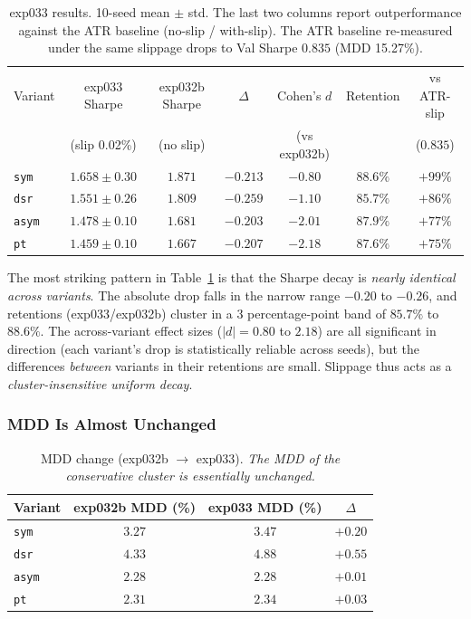 \documentclass[11pt, a4paper]{article}
\begin{document}
\begin{table}[!htbp]
\centering
\small
\caption{exp033 results. 10-seed mean $\pm$ std. The last two columns report
outperformance against the ATR baseline (no-slip / with-slip). The ATR
baseline re-measured under the same slippage drops to Val Sharpe $0.835$
(MDD 15.27\%).}
\begin{tabular}{lcccccc}
\toprule
Variant & exp033 Sharpe & exp032b Sharpe & $\Delta$ & Cohen's $d$ & Retention & vs ATR-slip \\
 & (slip 0.02\%) & (no slip) & & (vs exp032b) & & ($0.835$) \\
\midrule
\texttt{sym}  & $1.658 \pm 0.30$ & $1.871$ & $-0.213$ & $-0.80$ & $88.6\%$ & $+99\%$ \\
\texttt{dsr}  & $1.551 \pm 0.26$ & $1.809$ & $-0.259$ & $-1.10$ & $85.7\%$ & $+86\%$ \\
\texttt{asym} & $1.478 \pm 0.10$ & $1.681$ & $-0.203$ & $-2.01$ & $87.9\%$ & $+77\%$ \\
\texttt{pt}   & $1.459 \pm 0.10$ & $1.667$ & $-0.207$ & $-2.18$ & $87.6\%$ & $+75\%$ \\
\bottomrule
\end{tabular}
\label{tab:slippage_per_variant}
\end{table}

The most striking pattern in Table~\ref{tab:slippage_per_variant} is that the
Sharpe decay is \emph{nearly identical across variants}. The absolute drop
falls in the narrow range $-0.20$ to $-0.26$, and retentions
(exp033/exp032b) cluster in a 3 percentage-point band of $85.7\%$ to
$88.6\%$. The across-variant effect sizes ($|d| = 0.80$ to $2.18$) are all
significant in direction (each variant's drop is statistically reliable
across seeds), but the differences \emph{between} variants in their
retentions are small. Slippage thus acts as a \emph{cluster-insensitive
uniform decay}.

\subsubsection{MDD Is Almost Unchanged}
\label{sec:slippage_mdd}

\begin{table}[!htbp]
\centering
\caption{MDD change (exp032b $\to$ exp033). \textit{The MDD of the
conservative cluster is essentially unchanged.}}
\begin{tabular}{lccc}
\toprule
Variant & exp032b MDD (\%) & exp033 MDD (\%) & $\Delta$ \\
\midrule
\texttt{sym}  & $3.27$ & $3.47$ & $+0.20$ \\
\texttt{dsr}  & $4.33$ & $4.88$ & $+0.55$ \\
\texttt{asym} & $2.28$ & $2.28$ & $+0.01$ \\
\texttt{pt}   & $2.31$ & $2.34$ & $+0.03$ \\
\bottomrule
\end{tabular}
\label{tab:slippage_mdd}
\end{table}
\end{document}
